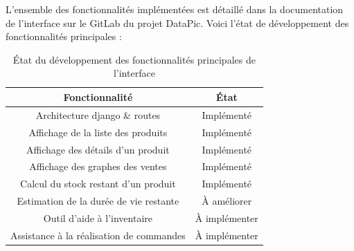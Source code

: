 L'ensemble des fonctionnalités implémentées est détaillé dans la documentation de l'interface sur le GitLab du projet DataPic. Voici l'état de développement des fonctionnalités principales :


\begin{table}[H]
    \centering
    \begin{tabular}{c|c}
        \hline
        Fonctionnalité                             & État \\
        \hline
        Architecture django \& routes              & Implémenté \\
        Affichage de la liste des produits         & Implémenté \\
        Affichage des détails d'un produit         & Implémenté \\
        Affichage des graphes des ventes           & Implémenté \\
        Calcul du stock restant d'un produit       & Implémenté \\
        Estimation de la durée de vie restante     & À améliorer \\
        Outil d'aide à l'inventaire                & À implémenter \\
        Assistance à la réalisation de commandes   & À implémenter \\
    \end{tabular}
    \caption{État du développement des fonctionnalités principales de l'interface}
    \label{tab:tab_fonctionnalités}
\end{table}